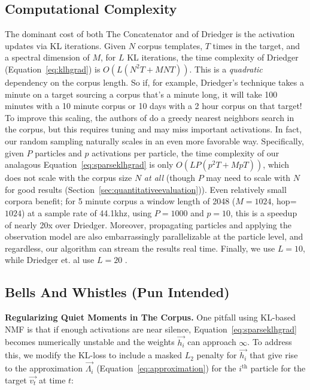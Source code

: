 \documentclass{article}
\begin{document}
\subsection{Computational Complexity} 
\label{sec:complexity}
The dominant cost of both The Concatenator and of Driedger is the activation updates via KL iterations.  Given $N$ corpus templates, $T$ times in the target, and a spectral dimension of $M$, for $L$ KL iterations, the time complexity of Driedger (Equation~\ref{eq:klhgrad}) is $O(L(N^2T + MNT))$.  This is a {\em quadratic} dependency on the corpus length.  So if, for example, Driedger's technique takes a minute on a target sourcing a corpus that's a minute long, it will take 100 minutes with a 10 minute corpus or 10 days with a 2 hour corpus on that target!  To improve this scaling, the authors of \cite{buch2017nichtnegativematrixfaktorisierungnutzendesklangsynthesensystem} do a greedy nearest neighbors search in the corpus, but this requires tuning and may miss important activations.  In fact, our random sampling naturally scales in an even more favorable way.  Specifically, given $P$ particles and $p$ activations per particle, the time complexity of our analagous Equation~\ref{eq:sparseklhgrad} is only $O(LP(p^2T + MpT))$, which does not scale with the corpus size $N$ {\em at all} (though $P$ may need to scale with $N$ for good results (Section~\ref{sec:quantitativeevaluation})).  Even relatively small corpora benefit; for 5 minute corpus a window length of 2048 ($M=1024$, hop=$1024$) at a sample rate of 44.1khz, using $P=1000$ and $p=10$, this is a speedup of nearly 20x over Driedger.  Moreover, propagating particles and applying the observation model are also embarrassingly parallelizable at the particle level, and regardless, our algorithm can stream the results real time.  Finally, we use $L=10$, while Driedger et. al use $L=20$ \cite{driedger2015let}.


\subsection{Bells And Whistles (Pun Intended)}

\textbf{Regularizing Quiet Moments in The Corpus.} One pitfall using KL-based NMF is that if enough activations are near silence, Equation~\ref{eq:sparseklhgrad} becomes numerically unstable and the weights $\vec{h_i}$ can approach $\infty$.  To address this, we modify the KL-loss to include a masked $L_2$ penalty for $\vec{h_i}$ that give rise to the approximation $\vec{\Lambda_i}$ (Equation~\ref{eq:approximation}) for the $i^{\text{th}}$ particle for the target $\vec{v_t}$ at time $t$:
\end{document}
